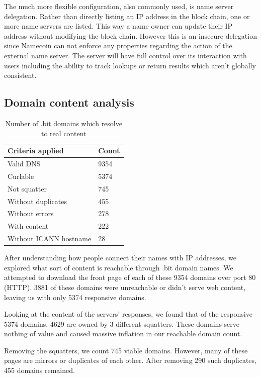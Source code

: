 The much more flexible configuration, also commonly used, is name server delegation. Rather than directly listing an IP address in the block chain, one or more name servers are listed. This way a name owner can update their IP address without modifying the block chain. However this is an insecure delegation since Namecoin can not enforce any properties regarding the action of the external name server. The server will have full control over its interaction with users including the ability to track lookups or return results which aren't globally consistent.

\subsection{Domain content analysis}
\label{domainbreakdown}

\begin{table}[t]
\centering
\begin{tabular}{ll}
Criteria applied & Count \\ \hline
Valid DNS          &  9354  \\
Curlable        & 5374     \\
Not squatter        & 745     \\
Without duplicates      & 455     \\
Without errors              & 278    \\
With content              & 222    \\
Without ICANN hostname   & 28   \\
\end{tabular}
\caption{Number of .bit domains which resolve to real content}
\end{table}

After understanding how people connect their names with IP addresses, we explored what sort of content is reachable through .bit domain names. We attempted to download the front page of each of these 9354 domains over port 80 (HTTP). 3881 of these domains were unreachable or didn't serve web content, leaving us with only 5374 responsive domains.

Looking at the content of the servers' responses, we found that of the responsive 5374 domains, 4629 are owned by 3 different squatters. These domains serve nothing of value and caused massive inflation in our reachable domain count.

Removing the squatters, we count 745 viable domains. However, many of these pages are mirrors or duplicates of each other. After removing 290 such duplicates, 455 domains remained.

